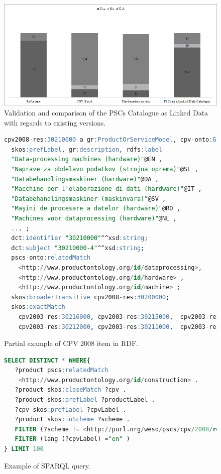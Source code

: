 \begin{itemize}
 \begin{figure}[!ht]
\centering
	\includegraphics[width=12cm]{./imgs/fig-4}
 \caption{Validation and comparison of the PSCs Catalogue as Linked Data with regards to existing versions.}
 \label{fig:results-4}
\end{figure}



\end{itemize}



\begin{figure}[!ht]
\begin{lstlisting}[language=SQL,basicstyle=\ttfamily\scriptsize]  
cpv2008-res:30210000 a gr:ProductOrServiceModel, cpv-onto:Group;
  skos:prefLabel, gr:description, rdfs:label 	
  "Data-processing machines (hardware)"@EN ,
  "Naprave za obdelavo podatkov (strojna oprema)"@SL , 
  "Databehandlingsmaskiner (hardware)"@DA ,
  "Macchine per l'elaborazione di dati (hardware)"@IT ,
  "Databehandlingsmaskiner (maskinvara)"@SV ,
  "Maşini de procesare a datelor (hardware)"@RO ,   
  "Machines voor dataprocessing (hardware)"@NL , 
  ... ;
  dct:identifier "30210000"^^xsd:string;
  dct:subject "30210000-4"^^xsd:string;
  pscs-onto:relatedMatch   
    <http://www.productontology.org/id/dataprocessing>,
    <http://www.productontology.org/id/hardware> ,
    <http://www.productontology.org/id/machine> ;	
  skos:broaderTransitive cpv2008-res:30200000;
  skos:exactMatch 
    cpv2003-res:30216000, cpv2003-res:30215000,  cpv2003-res:30213000,   
    cpv2003-res:30212000, cpv2003-res:30211000,  cpv2003-res:30214000.
\end{lstlisting}
\caption{Partial example of CPV 2008 item in RDF.}
 \label{fig:example-cpv-code}
\end{figure}


\begin{figure}[!ht]
\begin{lstlisting}[language=SQL,basicstyle=\ttfamily\scriptsize]  
SELECT DISTINCT * WHERE{
   ?product pscs:relatedMatch 
    <http://www.productontology.org/id/construction> .
   ?product skos:closeMatch ?cpv .
   ?product skos:prefLabel ?productLabel .
   ?cpv skos:prefLabel ?cpvLabel .
   ?product skos:inScheme ?scheme .
   FILTER (?scheme != <http://purl.org/weso/pscs/cpv/2008/resource/ds>) .
   FILTER (lang (?cpvLabel) ="en" )
} LIMIT 100
\end{lstlisting}
\caption{Example of SPARQL query.}
 \label{fig:example-sparql-query}
\end{figure}


